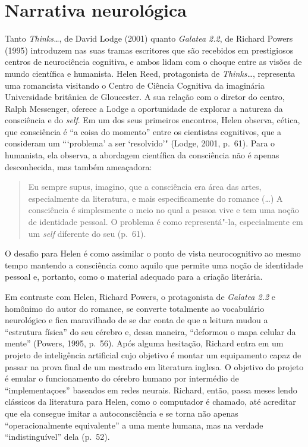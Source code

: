\section{Narrativa neurológica}

Tanto \emph{Thinks\ldots{}}, de David Lodge (2001) quanto \emph{Galatea 2.2},
de Richard Powers (1995) introduzem nas suas tramas escritores que são
recebidos em prestigiosos centros de neurociência cognitiva, e ambos
lidam com o choque entre as visões de mundo científica e humanista.
Helen Reed, protagonista de \emph{Thinks\ldots{}}, representa uma romancista
visitando o Centro de Ciência Cognitiva da imaginária Universidade
britânica de Gloucester. A sua relação com o diretor do centro, Ralph
Messenger, oferece a Lodge a oportunidade de explorar a natureza da
consciência e do \emph{self}. Em um dos seus primeiros encontros, Helen
observa, cética, que consciência é ``a coisa do momento'' entre os
cientistas cognitivos, que a consideram um ```problema' a ser
`resolvido'" (Lodge, 2001, p.~61). Para o humanista, ela observa, a
abordagem científica da consciência não é apenas desconhecida, mas
também ameaçadora:

\begin{quote}
Eu sempre supus, imagino, que a consciência era área das artes,
especialmente da literatura, e mais especificamente do romance (\ldots{}) A
consciência é simplesmente o meio no qual a pessoa vive e tem uma noção
de identidade pessoal. O problema é como representá"-la, especialmente em
um \emph{self} diferente do seu (p.~61).
\end{quote}

O desafio para Helen é como assimilar o ponto de vista neurocognitivo ao
mesmo tempo mantendo a consciência como aquilo que permite uma noção de
identidade pessoal e, portanto, como o material adequado para a criação
literária.

Em contraste com Helen, Richard Powers, o protagonista de \emph{Galatea
2.2} e homônimo do autor do romance, se converte totalmente ao
vocabulário neurológico e fica maravilhado de se dar conta de que a
leitura mudou a ``estrutura física'' do seu cérebro e, dessa maneira,
``deformou o mapa celular da mente'' (Powers, 1995, p.~56). Após alguma
hesitação, Richard entra em um projeto de inteligência artificial cujo
objetivo é montar um equipamento capaz de passar na prova final de um
mestrado em literatura inglesa. O objetivo do projeto é emular o
funcionamento do cérebro humano por intermédio de ``implementaçoes''
baseados em redes neurais. Richard, então, passa meses lendo clássicos
da literatura para Helen, como o computador é chamado, até acreditar que
ela consegue imitar a autoconsciência e se torna não apenas
``operacionalmente equivalente'' a uma mente humana, mas na verdade
``indistinguível'' dela (p.~52).

